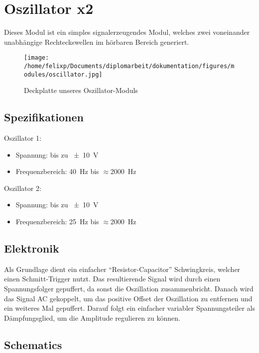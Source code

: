 \section{Oszillator x2 \label{Osci}}
\label{sec:org425d810}
Dieses Modul ist ein simples signalerzeugendes Modul, welches zwei voneinander unabhängige Rechteckswellen im hörbaren Bereich generiert.

\begin{figure}[htbp]
\centering
\texttt{[image: /home/felixp/Documents/diplomarbeit/dokumentation/figures/modules/oscillator.jpg]}
\caption{Deckplatte unseres Oszillator-Moduls}
\end{figure}

\subsection{Spezifikationen}
\label{sec:org0410079}
Oszillator 1:
\begin{itemize}
\item Spannung: bis zu \SI{\pm10}{\volt}
\item Frequenzbereich: \SI{40}{\hertz} bis \(\approx\)\SI{2000}{\hertz}
\end{itemize}

Oszillator 2:
\begin{itemize}
\item Spannung: bis zu \SI{\pm10}{\volt}
\item Frequenzbereich: \SI{25}{\hertz} bis \(\approx\)\SI{2000}{\hertz}
\end{itemize}

\subsection{Elektronik}
\label{sec:orgdf8aba6}
Als Grundlage dient ein einfacher "`Resistor-Capacitor"' Schwingkreis, welcher einen Schmitt-Trigger nutzt. Das resultierende Signal wird durch einen Spannungsfolger gepuffert, da sonst die Oszillation zusammenbricht. Danach wird das Signal AC gekoppelt, um das positive Offset der Oszillation zu entfernen und ein weiteres Mal gepuffert. Darauf folgt ein einfacher variabler Spannungsteiler als Dämpfungsglied, um die Amplitude regulieren zu können.

\subsection{Schematics}
\label{sec:org45830e7}

